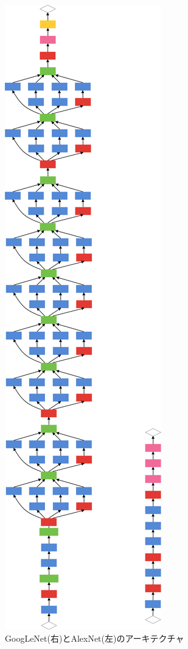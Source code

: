 {\begin{figure}[h]
  \centering
  \includegraphics[scale=0.5]{./chap2/fig/arch_diff.png}
  \caption{GoogLeNet(右)とAlexNet(左)のアーキテクチャ}
  \label{fig:googlenet}
\end{figure}


}
